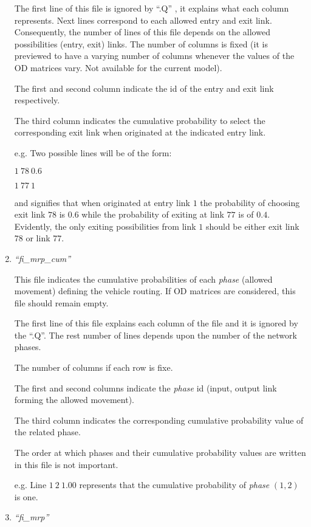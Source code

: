 \documentclass[10pt, conference, compsocconf]{IEEEtran}
\begin{document}
\begin{enumerate}
The first line of this file is ignored by ``.Q'' , it explains what each column represents.
Next lines correspond to each allowed entry and exit link. Consequently, the number of lines of this file depends on the allowed possibilities (entry, exit) links.
The number of columns is fixed (it is previewed to have a varying number of columns whenever the values of the OD matrices vary. Not available for the current model). 

The first and second column indicate the id of the entry and exit link respectively.

The third column indicates the cumulative probability to select the corresponding exit link when originated at the indicated entry link. 

e.g. Two  possible lines will be of the form:

  $ 1 \ 78	\ 0.6$ 

  $ 1 \ 77	\ 1$
  
 and signifies that when originated at entry link $1$ the probability of choosing exit link $78$ is $0.6$ while the probability of exiting at link $77$  is of $0.4$.
Evidently, the only exiting possibilities from link $1$ should be either exit link $78$ or link $77$.
  
\item \emph{``fi\_mrp\_cum''}

This  file indicates the cumulative probabilities of each \emph{phase} (allowed movement) defining the vehicle routing. If OD matrices are considered, this file should remain empty. 

The first line of this file explains each column of the file and it is ignored by the ``.Q''.
The rest number of lines depends upon the number of the network phases.

The number of columns if each row is fixe.

The first and second columns indicate the \emph{phase} id (input, output link forming the allowed movement).

The third column indicates the corresponding cumulative probability value of the related phase.  

The order at which phases and their cumulative probability values are written in this file is not important.


e.g. Line $1 \	 2	\ 1.00	$  represents that the cumulative probability of \emph{phase} $(1,2)$ is one.

\item \emph{``fi\_mrp''}


\end{enumerate}
\end{document}
